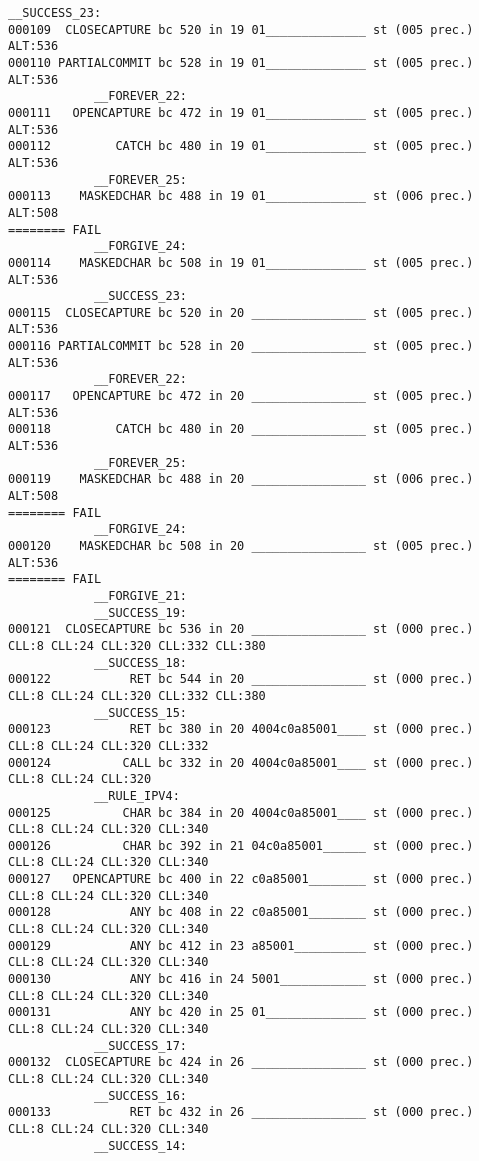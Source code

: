 \begin{changemargin}{-60mm}{0mm}
\begin{myquote}
\begin{Verbatim}[fontsize=\scriptsize]
            __SUCCESS_23:
000109  CLOSECAPTURE bc 520 in 19 01______________ st (005 prec.) ALT:536 
000110 PARTIALCOMMIT bc 528 in 19 01______________ st (005 prec.) ALT:536 
            __FOREVER_22:
000111   OPENCAPTURE bc 472 in 19 01______________ st (005 prec.) ALT:536 
000112         CATCH bc 480 in 19 01______________ st (005 prec.) ALT:536 
            __FOREVER_25:
000113    MASKEDCHAR bc 488 in 19 01______________ st (006 prec.) ALT:508 
======== FAIL
            __FORGIVE_24:
000114    MASKEDCHAR bc 508 in 19 01______________ st (005 prec.) ALT:536 
            __SUCCESS_23:
000115  CLOSECAPTURE bc 520 in 20 ________________ st (005 prec.) ALT:536 
000116 PARTIALCOMMIT bc 528 in 20 ________________ st (005 prec.) ALT:536 
            __FOREVER_22:
000117   OPENCAPTURE bc 472 in 20 ________________ st (005 prec.) ALT:536 
000118         CATCH bc 480 in 20 ________________ st (005 prec.) ALT:536 
            __FOREVER_25:
000119    MASKEDCHAR bc 488 in 20 ________________ st (006 prec.) ALT:508 
======== FAIL
            __FORGIVE_24:
000120    MASKEDCHAR bc 508 in 20 ________________ st (005 prec.) ALT:536 
======== FAIL
            __FORGIVE_21:
            __SUCCESS_19:
000121  CLOSECAPTURE bc 536 in 20 ________________ st (000 prec.) CLL:8 CLL:24 CLL:320 CLL:332 CLL:380 
            __SUCCESS_18:
000122           RET bc 544 in 20 ________________ st (000 prec.) CLL:8 CLL:24 CLL:320 CLL:332 CLL:380 
            __SUCCESS_15:
000123           RET bc 380 in 20 4004c0a85001____ st (000 prec.) CLL:8 CLL:24 CLL:320 CLL:332 
000124          CALL bc 332 in 20 4004c0a85001____ st (000 prec.) CLL:8 CLL:24 CLL:320 
            __RULE_IPV4:
000125          CHAR bc 384 in 20 4004c0a85001____ st (000 prec.) CLL:8 CLL:24 CLL:320 CLL:340 
000126          CHAR bc 392 in 21 04c0a85001______ st (000 prec.) CLL:8 CLL:24 CLL:320 CLL:340 
000127   OPENCAPTURE bc 400 in 22 c0a85001________ st (000 prec.) CLL:8 CLL:24 CLL:320 CLL:340 
000128           ANY bc 408 in 22 c0a85001________ st (000 prec.) CLL:8 CLL:24 CLL:320 CLL:340 
000129           ANY bc 412 in 23 a85001__________ st (000 prec.) CLL:8 CLL:24 CLL:320 CLL:340 
000130           ANY bc 416 in 24 5001____________ st (000 prec.) CLL:8 CLL:24 CLL:320 CLL:340 
000131           ANY bc 420 in 25 01______________ st (000 prec.) CLL:8 CLL:24 CLL:320 CLL:340 
            __SUCCESS_17:
000132  CLOSECAPTURE bc 424 in 26 ________________ st (000 prec.) CLL:8 CLL:24 CLL:320 CLL:340 
            __SUCCESS_16:
000133           RET bc 432 in 26 ________________ st (000 prec.) CLL:8 CLL:24 CLL:320 CLL:340 
            __SUCCESS_14:

\end{Verbatim}
\end{myquote}
\end{changemargin}
